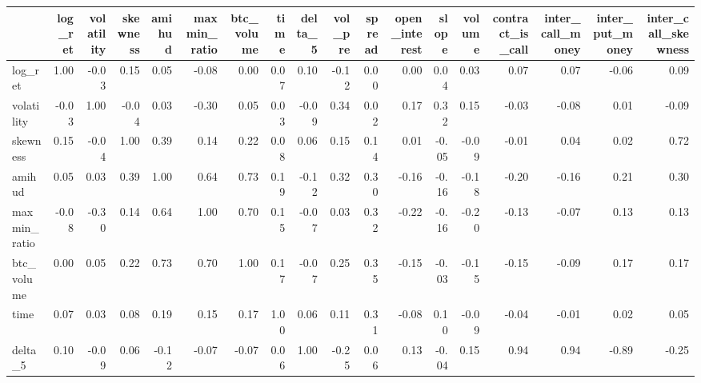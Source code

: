 \begin{tabular}{lrrrrrrrrrrrrrrrrr}
\toprule
{} &  log\_ret &  volatility &  skewness &  amihud &  maxmin\_ratio &  btc\_volume &  time &  delta\_5 &  vol\_pre &  spread &  open\_interest &  slope &  volume &  contract\_is\_call &  inter\_call\_money &  inter\_put\_money &  inter\_call\_skewness \\
\midrule
log\_ret             &     1.00 &       -0.03 &      0.15 &    0.05 &         -0.08 &        0.00 &  0.07 &     0.10 &    -0.12 &    0.00 &           0.00 &   0.04 &    0.03 &              0.07 &              0.07 &            -0.06 &                 0.09 \\
volatility          &    -0.03 &        1.00 &     -0.04 &    0.03 &         -0.30 &        0.05 &  0.03 &    -0.09 &     0.34 &    0.02 &           0.17 &   0.32 &    0.15 &             -0.03 &             -0.08 &             0.01 &                -0.09 \\
skewness            &     0.15 &       -0.04 &      1.00 &    0.39 &          0.14 &        0.22 &  0.08 &     0.06 &     0.15 &    0.14 &           0.01 &  -0.05 &   -0.09 &             -0.01 &              0.04 &             0.02 &                 0.72 \\
amihud              &     0.05 &        0.03 &      0.39 &    1.00 &          0.64 &        0.73 &  0.19 &    -0.12 &     0.32 &    0.30 &          -0.16 &  -0.16 &   -0.18 &             -0.20 &             -0.16 &             0.21 &                 0.30 \\
maxmin\_ratio        &    -0.08 &       -0.30 &      0.14 &    0.64 &          1.00 &        0.70 &  0.15 &    -0.07 &     0.03 &    0.32 &          -0.22 &  -0.16 &   -0.20 &             -0.13 &             -0.07 &             0.13 &                 0.13 \\
btc\_volume          &     0.00 &        0.05 &      0.22 &    0.73 &          0.70 &        1.00 &  0.17 &    -0.07 &     0.25 &    0.35 &          -0.15 &  -0.03 &   -0.15 &             -0.15 &             -0.09 &             0.17 &                 0.17 \\
time                &     0.07 &        0.03 &      0.08 &    0.19 &          0.15 &        0.17 &  1.00 &     0.06 &     0.11 &    0.31 &          -0.08 &   0.10 &   -0.09 &             -0.04 &             -0.01 &             0.02 &                 0.05 \\
delta\_5             &     0.10 &       -0.09 &      0.06 &   -0.12 &         -0.07 &       -0.07 &  0.06 &     1.00 &    -0.25 &    0.06 &           0.13 &  -0.04 &    0.15 &              0.94 &              0.94 &            -0.89 &                -0.25 \\

\end{tabular}
